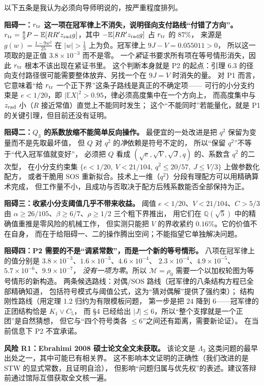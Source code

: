 \documentclass[UTF8,11pt]{ctexart}
\newcommand{\Lam}{\Lambda}
\newcommand{\E}{\mathbb{E}}
\newcommand{\M}{\mathcal{M}}
\begin{document}
以下五条是我认为必须向导师明说的，按严重程度排列。

\textbf{阻碍一：$r_{\rm tr}$ 这一项在冠军律上不消失，说明径向支付路线``付错了方向''。}
$r_{\rm tr}=\frac89P-\E[RR'z_{\rm rad}g]$，其中 $-\E[RR'z_{\rm rad}g]$ 占 $r_{\rm tr}$ 的 $87\%$，
来源是 $g(w)=\frac{1-9w^2}{25}$ 在 $|w|>\frac13$ 上为负。冠军律上 $9J-V=0.055011>0$，
所以这一项取的是正值 $3.8\times10^{-3}$ 而不是零。
一个\emph{紧}证书要求所有项在等号情形消失，因此 $r_{\rm tr}$ 根本不该出现在紧证书里。
这个判断本身就是 P2 的起点：引理 6.3 的径向支付路径很可能需要整体放弃、另找一个在 $9J=V$ 时消失的量。
对 P1 而言，它意味着``给 $r_{\rm tr}$ 一个正下界''这条子路线是真正的不确定项——
可行的小分支约束是 $e<1/20$，即 $|\E X|^2>0.95$，律必须高度集中在一个方向上，
而高度集中与 $z_{\rm rad}$ 小（$R$ 接近常值）直觉上不能同时发生；
这个``不能同时''若能量化，就是 P1 的关键引理，但目前还没有证明。

\textbf{阻碍二：$Q_3$ 的系数放缩不能简单反向操作。}
最便宜的一处改进是把 $q^2$ 保留为变量而不是先取最坏值，
但 $Q$ 对 $q^2$ 的\emph{净}依赖是符号不定的，
所以``保留 $q^2$''不等于``代入冠军值就变好''，
必须把 $Q$ 看成 $(\sqrt e,\sqrt V,\sqrt J,q)$ 的、系数含 $q^2$ 的二次型，
在小分支约束集 $\{e<1/20,\ V<21/104,\ q^2\le20/57,\ J\le V/3\}$ 上做参数化配方，
或者干脆用 SOS 重新拟合。技术上一维（$q^2$）分段有理配方可以用精确算术完成，
但工作量不小，且成功与否取决于配方后残系数能否全部保持为正。

\textbf{阻碍三：收紧小分支阈值几乎不带来收益。}
阈值 $e<1/20$、$V<21/104$、$C>5/3$ 由 $\alpha\ge26/105$、$\beta\ge6/7$、$\rho\ge1/2$ 三个粗下界推出，
用它们在 $\mathbb Q(\sqrt5)$ 中的精确值重推是零风险的机械工作，
但实测只能把 $V$ 的界收紧约 $0.16\%$。它的价值不在自身，
而在于给阻碍一、二的操作腾出空间；不能指望它单独解决问题。

\textbf{阻碍四：P2 需要的不是``调紧常数''，而是一个新的等号情形。}
八项在冠军律上的值分别是 $3.8\times10^{-3}$、$1.6\times10^{-3}$、$4.6\times10^{-4}$、
$2.3\times10^{-4}$、$4.9\times10^{-5}$、$5.7\times10^{-6}$、$9.9\times10^{-7}$，
\emph{没有一项为零}。所以 $\M=\rho_0$ 需要一个以加权轮图为等号情形的新构造。
两条候选路线：对偶/SOS 路线（冠军律的八条结构方程已全部精确知道，
包括符号模式与阈值公式，这为``猜对偶解''提供了强约束）；
结构刚性路线（用定理 1.2 归约为有限模板问题，
第一步是把 $24$ 降到 $6$——冠军律的正团结构恰是 $K_1\vee C_5$，
而 \S4 已经给出 $|J|\le6$，所以``整个支撑就是一个正团''是自然猜想，
但它与``四个符号类各 $\le6$''之间还有距离，需要新论证）。
在当前信息下 P2 不宜承诺。

\textbf{风险 R1：Ebrahimi 2008 硕士论文全文未获取。}
该论文是 $\Lam_3$ 这类问题的最早出处之一，其中可能已有相关界。
这不影响本文证明的正确性（我们改进的是 STW 的显式常数，且证明自洽），
但影响``问题归属与优先权''的表述。建议答辩前通过馆际互借获取全文核一遍。
\end{document}
